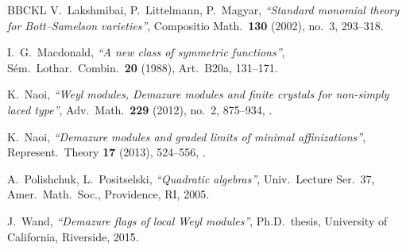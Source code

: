\documentclass[11pt]{amsart}
\makeatletter
\newcommand\btitle[1]{\textit{``#1''}}
\newcommand\eprint[1]{\@eprint#1\@nil}            %
\def\@eprint#1:#2\@nil{\href{https://arxiv.org/abs/#2}{arXiv:#2}}
\numberwithin{equation}{section}
\theoremstyle{definition}
\makeatother
\begin{document}
\begin{thebibliography}{BBCKL}
		 V.~Lakshmibai, P.~Littelmann, P.~Magyar, \btitle{Standard monomial theory for Bott--Samelson varieties}, Compositio Math.\ \textbf{130} (2002), no.~3, 293--318.

		 I.~G.~Macdonald, \btitle{A new class of symmetric functions}, S\'em.\ Lothar.\ Combin.\ \textbf{20} (1988), Art.~B20a, 131--171.


		 K.~Naoi, \btitle{Weyl modules, Demazure modules and finite crystals for non-simply laced type}, Adv.\ Math.\ \textbf{229} (2012), no.~2, 875--934, \eprint{arXiv:1012.5480}.

		 K.~Naoi, \btitle{Demazure modules and graded limits of minimal affinizations}, Represent.\ Theory \textbf{17} (2013), 524--556, \eprint{arXiv:1210.0175}.

		 A.~Polishchuk, L.~Positselski, \btitle{Quadratic algebras}, Univ.\ Lecture Ser.~37, Amer.\ Math.\ Soc., Providence, RI, 2005.

		 J.~Wand, \btitle{Demazure flags of local Weyl modules}, Ph.D.\ thesis, University of California, Riverside, 2015.

	\end{thebibliography}
	
\end{document}

